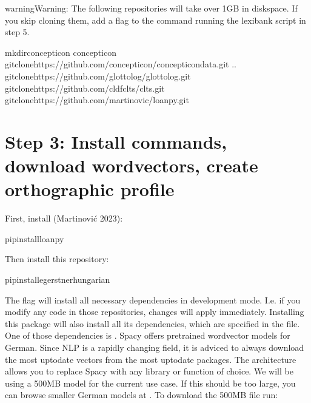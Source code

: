 \documentclass[letterpaper,10pt,english]{sphinxmanual}
\begin{document}
\begin{sphinxadmonition}{warning}{Warning:}
\sphinxAtStartPar
The following repositories will take over 1GB in disk\sphinxhyphen{}space. If you skip
cloning them,
add a  flag to the command running the lexibank script in step 5.
\end{sphinxadmonition}

\begin{sphinxVerbatim}[commandchars=\\\{\}]
mkdirconcepticon
concepticon
gitclonehttps://github.com/concepticon/concepticon\PYGZhy{}data.git
..
gitclonehttps://github.com/glottolog/glottolog.git
gitclonehttps://github.com/cldf\PYGZhy{}clts/clts.git
gitclonehttps://github.com/martino\PYGZhy{}vic/loanpy.git
\end{sphinxVerbatim}


\section{Step 3: Install commands, download wordvectors, create orthographic profile}
\label{\detokenize{mkcldf:step-3-install-commands-download-wordvectors-create-orthographic-profile}}
\sphinxAtStartPar
First, install 
(Martinović 2023):

\begin{sphinxVerbatim}[commandchars=\\\{\}]
pipinstallloanpy
\end{sphinxVerbatim}

\sphinxAtStartPar
Then install this repository:

\begin{sphinxVerbatim}[commandchars=\\\{\}]
pipinstall\PYGZhy{}egerstnerhungarian
\end{sphinxVerbatim}

\sphinxAtStartPar
The  flag will install all necessary dependencies in development mode.
I.e. if you modify any code in those repositories, changes will apply
immediately.
Installing this package will also install all its dependencies,
which are specified in the  file. One of those
dependencies is
. Spacy offers pre\sphinxhyphen{}trained
wordvector models for German. Since NLP is a rapidly changing field, it is
adviced
to always download the most up\sphinxhyphen{}to\sphinxhyphen{}date vectors from the most up\sphinxhyphen{}to\sphinxhyphen{}date
packages. The architecture allows you to replace Spacy with any library
or function of choice. We will be using a 500MB model for the current
use case. If this should be too large, you can browse smaller German models at
. To download the 500MB file run:
\end{document}

